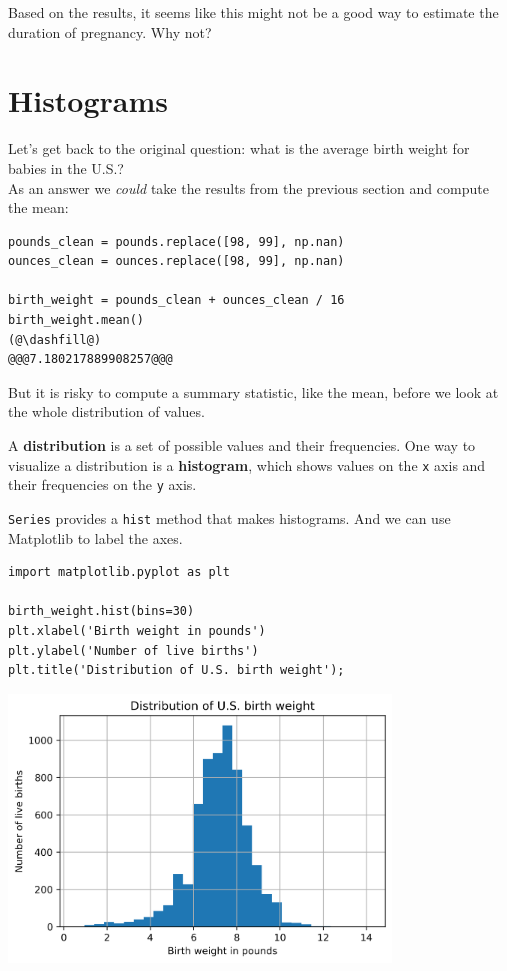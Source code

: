 Based on the results, it seems like this might not be a good way to
estimate the duration of pregnancy. Why not?

\hypertarget{histograms}{%
\section{Histograms}\label{histograms}}

Let's get back to the original question: what is the average birth
weight for babies in the U.S.?\\
As an answer we \emph{could} take the results from the previous section
and compute the mean:

\begin{lstlisting}[]
pounds_clean = pounds.replace([98, 99], np.nan)
ounces_clean = ounces.replace([98, 99], np.nan)

birth_weight = pounds_clean + ounces_clean / 16
birth_weight.mean()
(@\dashfill@)
@@@7.180217889908257@@@
\end{lstlisting}

But it is risky to compute a summary statistic, like the mean, before we
look at the whole distribution of values.

A \textbf{distribution} is a set of possible values and their
frequencies. One way to visualize a distribution is a
\textbf{histogram}, which shows values on the
\passthrough{\lstinline!x!} axis and their frequencies on the
\passthrough{\lstinline!y!} axis.

\passthrough{\lstinline!Series!} provides a
\passthrough{\lstinline!hist!} method that makes histograms. And we can
use Matplotlib to label the axes.

\begin{lstlisting}[]
import matplotlib.pyplot as plt

birth_weight.hist(bins=30)
plt.xlabel('Birth weight in pounds')
plt.ylabel('Number of live births')
plt.title('Distribution of U.S. birth weight');
\end{lstlisting}

\begin{center}
\includegraphics[width=4in]{chapters/07_dataframes_files/07_dataframes_60_0.png}
\end{center}

